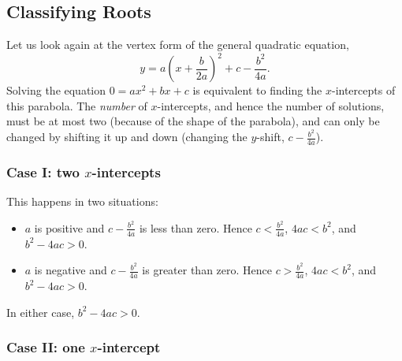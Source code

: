 \clearpage
\subsection*{Classifying Roots}
Let us look again at the vertex form of the general quadratic equation,
\begin{displaymath}
  y = a\left(x + \frac{b}{2a}\right)^2 + c - \frac{b^2}{4a}.
\end{displaymath}
Solving the equation $ 0 = ax^2 + bx + c $ is equivalent to finding the $ x$-intercepts of this parabola. The \emph{number} of $ x$-intercepts,
and hence the number of solutions, must be at most two (because of the shape of the parabola), and can only be changed by shifting it up and
down (changing the $ y$-shift, $ c - \frac{b^2}{4a} $).

\subsubsection*{Case I: two $ x$-intercepts}
\begin{center}
\end{center}
This happens in two situations:
\begin{itemize}
  \item $ a $ is positive and $ c - \frac{b^2}{4a} $ is less than zero. Hence $ c < \frac{b^2}{4a} $, $ 4ac < b^2 $, and $ b^2 - 4ac > 0 $.
  \item $ a $ is negative and $ c - \frac{b^2}{4a} $ is greater than zero. Hence $ c > \frac{b^2}{4a} $, $ 4ac < b^2 $, and $ b^2 - 4ac > 0 $.
\end{itemize}

In either case, $ b^2 - 4ac > 0 $.

\subsubsection*{Case II: one $ x$-intercept}
\begin{center}
\end{center}


